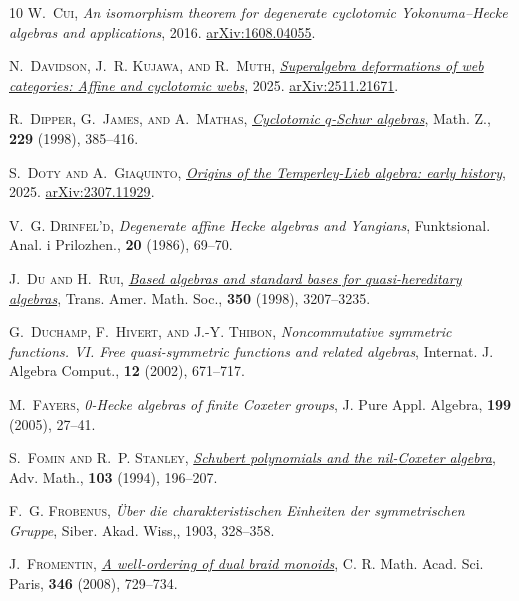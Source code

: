 \documentclass[a4paper,11pt]{amsart}
\numberwithin{equation}{subsection}
\theoremstyle{definition}
\theoremstyle{theorem}
\theoremstyle{remark}
\begin{document}
\begin{thebibliography}{10}
\textsc{W.~Cui}, \textit{An isomorphism theorem for degenerate cyclotomic
  {Y}okonuma--{H}ecke algebras and applications}, 2016.
\newblock \href{http://arxiv.org/abs/1608.04055}{arXiv:1608.04055}.

\textsc{N.~Davidson, J.~R. Kujawa, and R.~Muth},
  \href{https://arxiv.org/abs/2511.21671}{\textit{Superalgebra deformations of
  web categories: Affine and cyclotomic webs}}, 2025.
\newblock \href{http://arxiv.org/abs/2511.21671}{arXiv:2511.21671}.

\textsc{R.~Dipper, G.~James, and A.~Mathas},
  \href{http://dx.doi.org/10.1007/PL00004665}{\textit{Cyclotomic {$q$}-{S}chur
  algebras}}, Math. Z., \textbf{229} (1998), 385--416.

\textsc{S.~Doty and A.~Giaquinto},
  \href{https://arxiv.org/abs/2307.11929}{\textit{Origins of the Temperley-Lieb
  algebra: early history}}, 2025.
\newblock \href{http://arxiv.org/abs/2307.11929}{arXiv:2307.11929}.

\textsc{V.~G. Drinfel'd}, \textit{Degenerate affine {H}ecke algebras and
  {Y}angians}, Funktsional. Anal. i Prilozhen., \textbf{20} (1986), 69--70.

\textsc{J.~Du and H.~Rui},
  \href{http://dx.doi.org/10.1090/S0002-9947-98-02305-8}{\textit{Based algebras
  and standard bases for quasi-hereditary algebras}}, Trans. Amer. Math. Soc.,
  \textbf{350} (1998), 3207--3235.

\textsc{G.~Duchamp, F.~Hivert, and J.-Y. Thibon}, \textit{Noncommutative
  symmetric functions. {VI}. {F}ree quasi-symmetric functions and related
  algebras}, Internat. J. Algebra Comput., \textbf{12} (2002), 671--717.

\textsc{M.~Fayers}, \textit{0-{H}ecke algebras of finite {C}oxeter groups}, J.
  Pure Appl. Algebra, \textbf{199} (2005), 27--41.

\textsc{S.~Fomin and R.~P. Stanley},
  \href{http://dx.doi.org/10.1006/aima.1994.1009}{\textit{Schubert polynomials
  and the nil-{C}oxeter algebra}}, Adv. Math., \textbf{103} (1994), 196--207.

\textsc{F.~G. Frobenus}, \textit{{Über die charakteristischen Einheiten der
  symmetrischen Gruppe}}, Siber. Akad. Wiss,, 1903, 328--358.

\textsc{J.~Fromentin},
  \href{http://dx.doi.org/10.1016/j.crma.2008.05.001}{\textit{A well-ordering
  of dual braid monoids}}, C. R. Math. Acad. Sci. Paris, \textbf{346} (2008),
  729--734.


\end{thebibliography}
\end{document}
